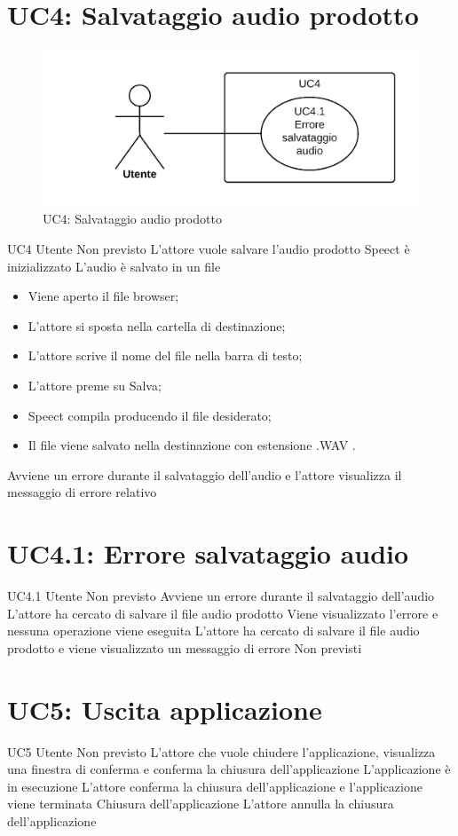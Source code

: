 \documentclass[../AnalisideiRequisiti.tex]{subfiles}
\begin{document}
\section{UC4: Salvataggio audio prodotto}
\begin{figure}[H]
	\centering
	\includegraphics[width=\textwidth]{../img/UC4.png}
	\caption{UC4: Salvataggio audio prodotto}
\end{figure}
\UserCase
{UC4}
{Utente}
{Non previsto}
{L'attore vuole salvare l'audio prodotto}
{Speect è inizializzato }
{L'audio è salvato in un file}
{
		\begin{itemize}
		\item{} Viene aperto il file browser;
		\item{} L'attore si sposta nella cartella di destinazione;
		\item{} L'attore scrive il nome del file nella barra di testo;
		\item{} L'attore preme su Salva;
		\item{} Speect compila producendo il file desiderato;
		\item{} Il file viene salvato nella destinazione con estensione .WAV .
		\end{itemize}
}
{Avviene un errore durante il salvataggio dell'audio e l'attore visualizza il messaggio di errore relativo }
		
\section{UC4.1: Errore salvataggio audio}
\UserCase
{UC4.1}
{Utente}
{Non previsto}
{Avviene un errore durante il salvataggio dell'audio}
{L'attore ha cercato di salvare il file audio prodotto} 
{Viene visualizzato l'errore e nessuna operazione viene eseguita}
{L'attore ha cercato di salvare il file audio prodotto e viene visualizzato un messaggio di errore}
{Non previsti}

\section{UC5: Uscita applicazione}
\UserCase
{UC5}
{Utente}
{Non previsto}
{L'attore che vuole chiudere l'applicazione, visualizza una finestra di conferma e conferma la chiusura dell'applicazione}
{L'applicazione è in esecuzione}
{L'attore conferma la chiusura dell'applicazione e l'applicazione viene terminata}
{Chiusura dell'applicazione}
{L'attore annulla la chiusura dell'applicazione}
\end{document}
